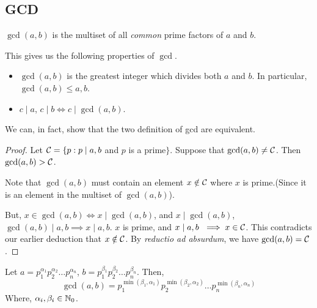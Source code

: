 \subsection{GCD}

\begin{definition}
    \( \gcd(a,b)\) is the multiset of all \textit{common} prime factors of \(a\) and \(b\).
\end{definition}

This gives us the following properties of \(\gcd\).

\begin{proposition}
    \hfill
    \begin{itemize}
        \item \(\gcd(a,b)\) is the greatest integer which divides both \(a\) and \(b\). In particular, \(\gcd(a,b) \le a, b\).
        \item \(c \mid a\), \(c \mid b \iff c \mid \gcd(a,b)\).
    \end{itemize}
\end{proposition}

We can, in fact, show that the two definition of gcd are equivalent. 

\begin{proof}
    Let \( \mathcal C = \{p : p \mid a, b \) and \(p \) is a prime\( \} \). Suppose that \(\gcd(a,b) \ne \mathcal C \). Then \( \gcd(a,b) > \mathcal C \). 
    \\
    \par
    Note that \( \gcd(a,b)\) must contain an element \(x \notin \mathcal C \) where \(x\) is prime.(Since it is an element in the multiset of \(\gcd(a,b)\)). 
    \par
    But, \(x \in \gcd(a,b) \iff x \mid \gcd(a,b)\), and \(x \mid \gcd(a,b) \), \(\gcd(a,b) \mid a, b \implies x \mid a,b\). \(x\) is prime, and \(x \mid a,b\ \implies x \in \mathcal C\). This contradicts our earlier deduction that \(x \notin \mathcal C\). By \textit{reductio ad absurdum}, we have \(\gcd(a,b) = \mathcal C \).
\end{proof}

\begin{claim}
    
    Let \(a = p_{1} ^{\alpha_1} p_{2} ^{\alpha_2} \ldots p_{n}^{\alpha_n}\), \(b = p_{1} ^{\beta_1} p_{2} ^{\beta_2} \ldots p_{n}^{\beta_n}\). Then, \[\gcd(a,b)= p_{1} ^{\min(\beta_1, \alpha_1)} p_{2} ^{\min(\beta_2, \alpha_2)} \ldots p_{n}^{\min(\beta_n, \alpha_n)} \]
    Where, \(\alpha_i, \beta_i \in \mathbb N_0 \).
    
\end{claim}

